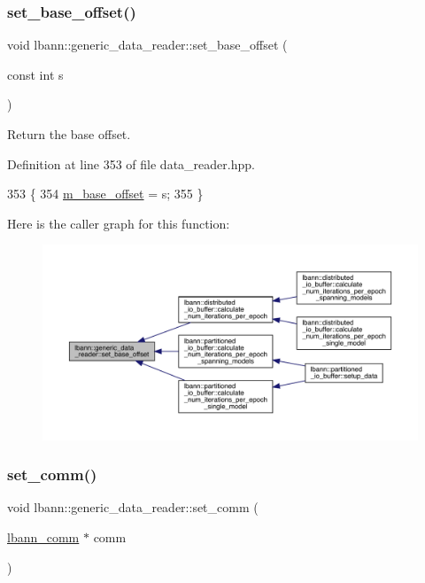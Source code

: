 \subsubsection{\texorpdfstring{set\+\_\+base\+\_\+offset()}{set\_base\_offset()}}
{\footnotesize\ttfamily void lbann\+::generic\+\_\+data\+\_\+reader\+::set\+\_\+base\+\_\+offset (\begin{DoxyParamCaption}\item[{const int}]{s }\end{DoxyParamCaption})\hspace{0.3cm}{\ttfamily [inline]}}



Return the base offset. 



Definition at line 353 of file data\+\_\+reader.\+hpp.


\begin{DoxyCode}
353                                     \{
354     \hyperlink{classlbann_1_1generic__data__reader_a77946c4dca753c23f39e9a490eba1229}{m\_base\_offset} = s;
355   \}
\end{DoxyCode}
Here is the caller graph for this function\+:\nopagebreak
\begin{figure}[H]
\begin{center}
\leavevmode
\includegraphics[width=350pt]{classlbann_1_1generic__data__reader_adcf4c6012f44c78589bb75ea530cf518_icgraph}
\end{center}
\end{figure}
\mbox{\label{classlbann_1_1generic__data__reader_a39f4d80661a2c8e24d8d167ad5bd6c6b}} 
\subsubsection{\texorpdfstring{set\+\_\+comm()}{set\_comm()}}
{\footnotesize\ttfamily void lbann\+::generic\+\_\+data\+\_\+reader\+::set\+\_\+comm (\begin{DoxyParamCaption}\item[{\hyperlink{classlbann_1_1lbann__comm}{lbann\+\_\+comm} $\ast$}]{comm }\end{DoxyParamCaption})\hspace{0.3cm}{\ttfamily [inline]}}



